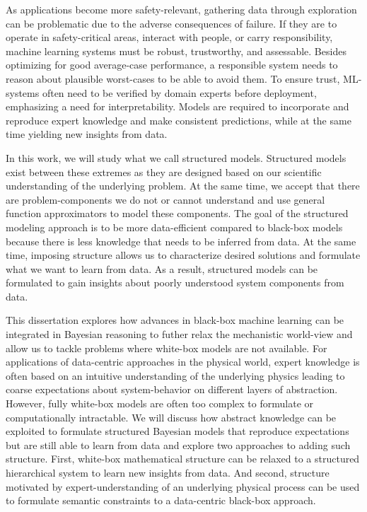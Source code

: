 As applications become more safety-relevant, gathering data through exploration can be problematic due to the adverse consequences of failure.
If they are to operate in safety-critical areas, interact with people, or carry responsibility, machine learning systems must be robust, trustworthy, and assessable.
Besides optimizing for good average-case performance, a responsible system needs to reason about plausible worst-cases to be able to avoid them.
To ensure trust, ML-systems often need to be verified by domain experts before deployment, emphasizing a need for interpretability.
Models are required to incorporate and reproduce expert knowledge and make consistent predictions, while at the same time yielding new insights from data.

In this work, we will study what we call structured models.
Structured models exist between these extremes as they are designed based on our scientific understanding of the underlying problem.
At the same time, we accept that there are problem-components we do not or cannot understand and use general function approximators to model these components.
The goal of the structured modeling approach is to be more data-efficient compared to black-box models because there is less knowledge that needs to be inferred from data.
At the same time, imposing structure allows us to characterize desired solutions and formulate what we want to learn from data.
As a result, structured models can be formulated to gain insights about poorly understood system components from data.

This dissertation explores how advances in black-box machine learning can be integrated in Bayesian reasoning to futher relax the mechanistic world-view and allow us to tackle problems where white-box models are not available.
For applications of data-centric approaches in the physical world, expert knowledge is often based on an intuitive understanding of the underlying physics leading to coarse expectations about system-behavior on different layers of abstraction.
However, fully white-box models are often too complex to formulate or computationally intractable.
We will discuss how abstract knowledge can be exploited to formulate structured Bayesian models that reproduce expectations but are still able to learn from data and explore two approaches to adding such structure.
First, white-box mathematical structure can be relaxed to a structured hierarchical system to learn new insights from data.
And second, structure motivated by expert-understanding of an underlying physical process can be used to formulate semantic constraints to a data-centric black-box approach.


